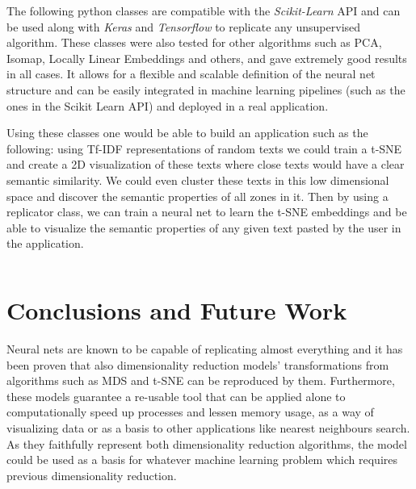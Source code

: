 \documentclass[a4paper,11pt,spanish]{report}
\begin{document}
The following python classes are compatible with the \textit{Scikit-Learn} API and can be used along with \textit{Keras} and \textit{Tensorflow} to replicate any unsupervised algorithm. These classes were also tested for other algorithms such as PCA, Isomap, Locally Linear Embeddings and others, and gave extremely good results in all cases. It allows for a flexible and scalable definition of the neural net structure and can be easily integrated in machine learning pipelines (such as the ones in the Scikit Learn API) and deployed in a real application.

Using these classes one would be able to build an application such as the following: using Tf-IDF representations of random texts we could train a t-SNE and create a 2D visualization of these texts where close texts would have a clear semantic similarity. We could even cluster these texts in this low dimensional space and discover the semantic properties of all zones in it. Then by using a replicator class, we can train a neural net to learn the t-SNE embeddings and be able to visualize the semantic properties of any given text pasted by the user in the application.

\vspace{10px}

\inputminted[baselinestretch=1, fontsize=\scriptsize, breaklines]{python}{classes.py}



\chapter{Conclusions and Future Work}
\label{chap:conc}

Neural nets are known to be capable of replicating almost everything and it has been proven that also dimensionality reduction models' transformations from algorithms such as MDS and t-SNE can be reproduced by them. Furthermore, these models guarantee a re-usable tool that can be applied alone to computationally speed up processes and lessen memory usage, as a way of visualizing data or as a basis to other applications like nearest neighbours search. As they faithfully represent both dimensionality reduction algorithms, the model could be used as a basis for whatever machine learning problem which requires previous dimensionality reduction.
\end{document}
